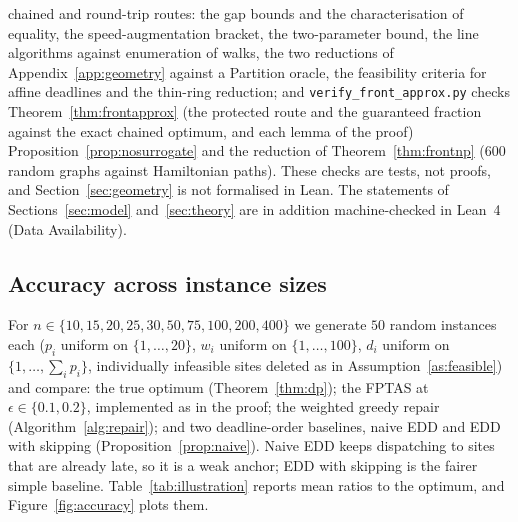 \documentclass[pdflatex,sn-mathphys-ay]{sn-jnl}
\theoremstyle{thmstyleone}
\theoremstyle{thmstyletwo}
\theoremstyle{thmstylethree}
\begin{document}
chained and round-trip routes: the gap bounds and the characterisation
of equality, the speed-augmentation bracket, the two-parameter bound, the
line algorithms against enumeration of walks, the two reductions of
Appendix~\ref{app:geometry} against a Partition oracle, the feasibility
criteria for affine deadlines and the thin-ring reduction; and
\texttt{verify\_front\_approx.py} checks Theorem~\ref{thm:frontapprox}
(the protected route and the guaranteed fraction against the exact
chained optimum, and each lemma of the proof) Proposition~\ref{prop:nosurrogate} and the reduction of
Theorem~\ref{thm:frontnp} ($600$ random graphs against Hamiltonian paths). These checks are
tests, not proofs, and Section~\ref{sec:geometry} is not formalised in
Lean. The statements of Sections~\ref{sec:model} and~\ref{sec:theory}
are in addition machine-checked in Lean~4 (Data Availability).

\subsection{Accuracy across instance sizes}\label{sec:acc}

For $n \in \{10,15,20,25,30,50,75,100,200,400\}$ we generate $50$
random instances each ($p_i$ uniform on $\{1,\dots,20\}$, $w_i$ uniform
on $\{1,\dots,100\}$, $d_i$ uniform on $\{1,\dots,\sum_i p_i\}$,
individually infeasible sites deleted as in
Assumption~\ref{as:feasible}) and compare: the true optimum
(Theorem~\ref{thm:dp}); the FPTAS at $\epsilon\in\{0.1,0.2\}$,
implemented as in the proof; the weighted greedy repair
(Algorithm~\ref{alg:repair}); and two deadline-order baselines, naive
EDD and EDD with skipping (Proposition~\ref{prop:naive}). Naive EDD
keeps dispatching to sites that are already late, so it is a weak
anchor; EDD with skipping is the fairer simple baseline.
Table~\ref{tab:illustration} reports mean ratios to the optimum, and
Figure~\ref{fig:accuracy} plots them.
\end{document}
